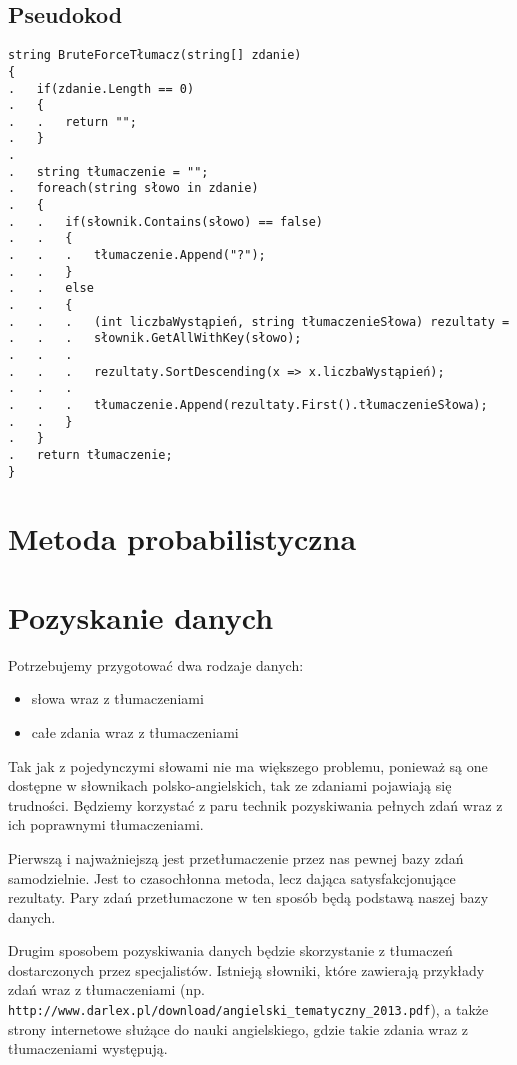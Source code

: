 \documentclass[12pt]{article}
\begin{document}
\newpage
\subsection{Pseudokod}
\begin{verbatim}
string BruteForceTłumacz(string[] zdanie)
{
.   if(zdanie.Length == 0)
.   {
.   .   return "";
.   }
.   	
.   string tłumaczenie = "";
.   foreach(string słowo in zdanie)
.   {
.   .   if(słownik.Contains(słowo) == false)
.   .   {
.   .   .   tłumaczenie.Append("?");
.   .   }
.   .   else
.   .   {
.   .   .   (int liczbaWystąpień, string tłumaczenieSłowa) rezultaty = 
.   .   .   słownik.GetAllWithKey(słowo);
.   .   .
.   .   .   rezultaty.SortDescending(x => x.liczbaWystąpień);
.   .   .
.   .   .   tłumaczenie.Append(rezultaty.First().tłumaczenieSłowa);
.   .   }
.   }
.   return tłumaczenie;
}
\end{verbatim}

\section{Metoda probabilistyczna}



\section{Pozyskanie danych}

Potrzebujemy przygotować dwa rodzaje danych: 

\begin{itemize}
    \item  słowa wraz z tłumaczeniami
    \item  całe zdania wraz z tłumaczeniami
\end{itemize}

Tak jak z pojedynczymi słowami nie ma większego problemu, ponieważ są one dostępne w słownikach polsko-angielskich, tak ze zdaniami pojawiają się trudności. Będziemy korzystać z paru technik pozyskiwania pełnych zdań wraz z ich poprawnymi tłumaczeniami. 

Pierwszą i najważniejszą jest przetłumaczenie przez nas pewnej bazy zdań samodzielnie. Jest to czasochłonna metoda, lecz dająca satysfakcjonujące rezultaty. Pary zdań przetłumaczone w ten sposób będą podstawą naszej bazy danych. 

Drugim sposobem pozyskiwania danych będzie skorzystanie z tłumaczeń dostarczonych przez specjalistów. Istnieją słowniki, które zawierają przykłady zdań wraz z tłumaczeniami (np. \nolinkurl{http://www.darlex.pl/download/angielski_tematyczny_2013.pdf}), a także strony internetowe służące do nauki angielskiego, gdzie takie zdania wraz z tłumaczeniami występują. 
\end{document}
